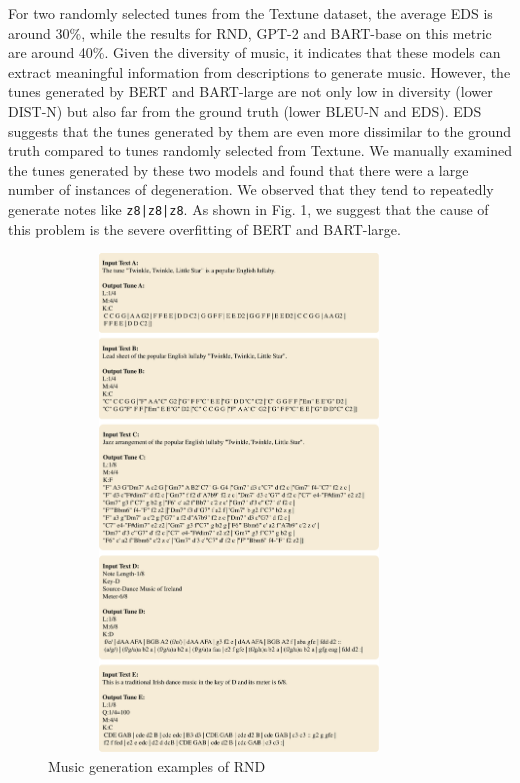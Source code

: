 \documentclass[letterpaper]{article} %
\begin{document}
For two randomly selected tunes from the Textune dataset, the average EDS is around 30\%, while the results for RND, GPT-2 and BART-base on this metric are around 40\%. Given the diversity of music, it indicates that these models can extract meaningful information from descriptions to generate music. However, the tunes generated by BERT and BART-large are not only low in diversity (lower DIST-N) but also far from the ground truth (lower BLEU-N and EDS). EDS suggests that the tunes generated by them are even more dissimilar to the ground truth compared to tunes randomly selected from Textune. We manually examined the tunes generated by these two models and found that there were a large number of instances of degeneration. We observed that they tend to repeatedly generate notes like \texttt{z8|z8|z8}. As shown in Fig. 1, we suggest that the cause of this problem is the severe overfitting of BERT and BART-large.

\begin{figure}[t]
\centering
\begin{minipage}{8.25cm}
\includegraphics[width=0.9\textwidth,height=5.2in ]{fig2.pdf}
\end{minipage}
\centering
\caption{Music generation examples of RND}
\end{figure}
\end{document}
